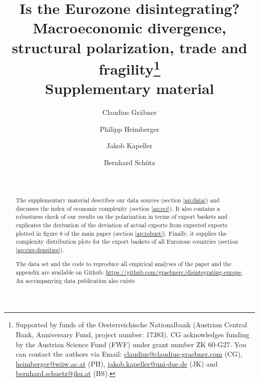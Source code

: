 \documentclass[11pt,a4paper]{article}
\begin{document}
\date{\ }
\title{\textbf{Is the Eurozone disintegrating?}\\  \textbf{Macroeconomic divergence, structural polarization, trade and fragility}\thanks{Supported by funds of the Oesterreichische Nationalbank (Austrian Central Bank, Anniversary Fund, project number: 17383). CG acknowledges funding by the Austrian Science Fund (FWF) under grant number ZK 60-G27. You can contact the authors via Email: \href{mailto:claudius@claudius-graebner.com}{claudius@claudius-graebner.com} (CG), \href{mailto:heimberger@wiiw.ac.at}{heimberger@wiiw.ac.at} (PH), \href{mailto:jakob.kapeller@uni-due.de}{jakob.kapeller@uni-due.de} (JK) and \href{mailto:bernhard.schuetz@jku.at}{bernhard.schuetz@jku.at} (BS).} \\
Supplementary material}

\author[a,b,c]{Claudius Gr\"abner}
\author[a,d]{Philipp Heimberger}
\author[a,b]{Jakob Kapeller}
\author[a,e]{Bernhard Sch\"utz}

\setcounter{Maxaffil}{0}
\renewcommand\Affilfont{\itshape\small}


\maketitle
\begin{abstract}
The supplementary material describes our data sources (section \ref{ap:data})
and discusses the index of economic complexity (section \ref{ap:eci}).
It also contains a robustness check of our results on the polarization in terms of export baskets and explicates the derivation of the deviation of actual exports from expected exports plotted in figure 8 of the main paper (section \ref{ap:robust}). 
Finally, it supplies the complexity distribution plots for the export baskets of all Eurozone countries (section \ref{ap:exp-densities}).

The data set and the code to reproduce all empirical analyses of the paper and the appendix are available on Github: \href{https://github.com/graebnerc/disintegrating-europe}{https://github.com/graebnerc/disintegrating-europe}. An accompanying data publication also exists \citep{Grabner:2019data}

\end{abstract}
\end{document}
